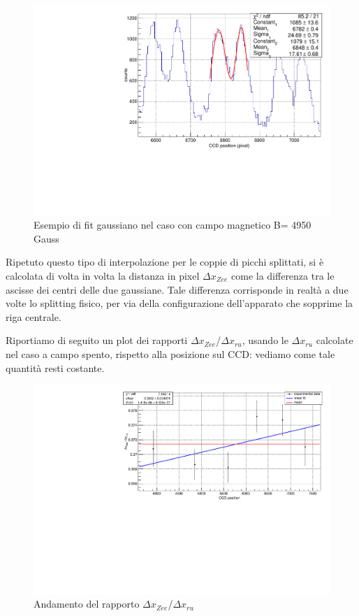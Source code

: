 \documentclass{article}
\begin{document}
	\begin{center}
		\begin{figure}[H]
			\centering
			\includegraphics[scale=0.38, angle=0]{campomax/singolo.pdf}
			\caption{ Esempio di fit gaussiano nel caso con campo magnetico B= 4950 Gauss}
			\label{fig:singoloBonMax}
		\end{figure}
	\end{center}

	Ripetuto questo tipo di interpolazione per le coppie di picchi splittati, si è calcolata di volta 
	in volta la distanza in pixel $\Delta x_{Zee}$ come la differenza tra le ascisse dei centri delle due
	gaussiane. Tale differenza corrisponde in realtà a due volte lo splitting fisico, per via della 
	configurazione dell'apparato che sopprime la riga centrale.

	Riportiamo di seguito un plot dei rapporti $\Delta x_{Zee}$/$\Delta x_{ru}$, usando le $\Delta x_{ru}$
	calcolate nel caso a campo spento, rispetto alla posizione sul CCD: vediamo come tale quantità resti 
	costante.

	\begin{center}
		\begin{figure}[H]
			\centering
			\includegraphics[scale=0.38, angle=0]{campomax/fit.pdf}
			\caption{Andamento del rapporto $\Delta x_{Zee}$/$\Delta x_{ru}$}
			\label{fig:fit_rapporto}
		\end{figure}
	\end{center}
\end{document}
